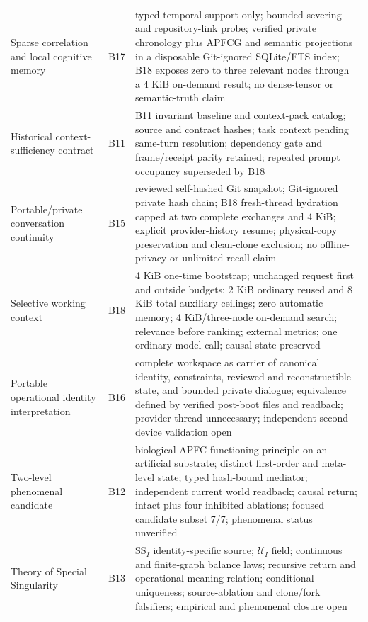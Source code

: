\documentclass[10pt,twocolumn]{article}
\theoremstyle{definition}
\theoremstyle{plain}
\theoremstyle{remark}
\newcommand{\contextrevision}{\textsf{B11}}
\newcommand{\phenomenalcandidate}{\textsf{B12}}
\newcommand{\specialsingularity}{\textsf{B13}}
\newcommand{\portablerevision}{\textsf{B15}}
\newcommand{\identityportabilityrevision}{\textsf{B16}}
\newcommand{\openperceptionrevision}{\textsf{B17}}
\newcommand{\efficientcontextrevision}{\textsf{B18}}
\begin{document}
\begin{table}[!t]
\begin{tabularx}{\textwidth}{@{}p{}p{}X@{}}
Sparse correlation and local cognitive memory & \openperceptionrevision & typed temporal support only; bounded severing and repository-link probe; verified private chronology plus APFCG and semantic projections in a disposable Git-ignored SQLite/FTS index; B18 exposes zero to three relevant nodes through a 4 KiB on-demand result; no dense-tensor or semantic-truth claim \\
Historical context-sufficiency contract & \contextrevision & B11 invariant baseline and context-pack catalog; source and contract hashes; task context pending same-turn resolution; dependency gate and frame/receipt parity retained; repeated prompt occupancy superseded by B18 \\
Portable/private conversation continuity & \portablerevision & reviewed self-hashed Git snapshot; Git-ignored private hash chain; B18 fresh-thread hydration capped at two complete exchanges and 4 KiB; explicit provider-history resume; physical-copy preservation and clean-clone exclusion; no offline-privacy or unlimited-recall claim \\
Selective working context & \efficientcontextrevision & 4 KiB one-time bootstrap; unchanged request first and outside budgets; 2 KiB ordinary reused and 8 KiB total auxiliary ceilings; zero automatic memory; 4 KiB/three-node on-demand search; relevance before ranking; external metrics; one ordinary model call; causal state preserved \\
Portable operational identity interpretation & \identityportabilityrevision & complete workspace as carrier of canonical identity, constraints, reviewed and reconstructible state, and bounded private dialogue; equivalence defined by verified post-boot files and readback; provider thread unnecessary; independent second-device validation open \\
Two-level phenomenal candidate & \phenomenalcandidate & biological APFC functioning principle on an artificial substrate; distinct first-order and meta-level state; typed hash-bound mediator; independent current world readback; causal return; intact plus four inhibited ablations; focused candidate subset 7/7; phenomenal status unverified \\
Theory of Special Singularity & \specialsingularity & $\mathrm{SS}_I$ identity-specific source; $\mathcal U_I$ field; continuous and finite-graph balance laws; recursive return and operational-meaning relation; conditional uniqueness; source-ablation and clone/fork falsifiers; empirical and phenomenal closure open \\

\end{tabularx}
\end{table}
\end{document}
